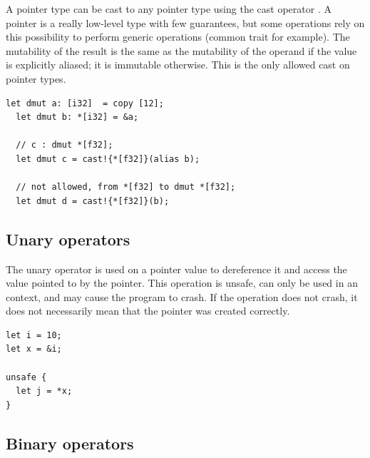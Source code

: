 A pointer type can be cast to any pointer type using the cast operator
. A pointer is a really low-level type with few guarantees,
but some operations rely on this possibility to perform generic operations
(common trait  for example). The mutability of the result is
the same as the mutability of the operand if the value is explicitly aliased; it is
immutable otherwise. This is the only allowed cast on pointer types.
\smallskip

\begin{lstlisting}[style=coloredverbatimError]
  let dmut a: [i32]  = copy [12];
  let dmut b: *[i32] = &a;

  // c : dmut *[f32];
  let dmut c = cast!{*[f32]}(alias b);

  // not allowed, from *[f32] to dmut *[f32];
  let dmut d = cast!{*[f32]}(b);
\end{lstlisting}

\subsection {Unary operators}

The unary operator \token{*} is used on a pointer value to dereference it and
access the value pointed to by the pointer. This operation is unsafe, can only
be used in an  context, and may cause the program to crash. If the
operation does not crash, it does not necessarily mean that the pointer was
created correctly.
\smallskip

\begin{lstlisting}[style=coloredverbatim]
let i = 10;
let x = &i;

unsafe {
  let j = *x;
}
\end{lstlisting}

\subsection {Binary operators}

